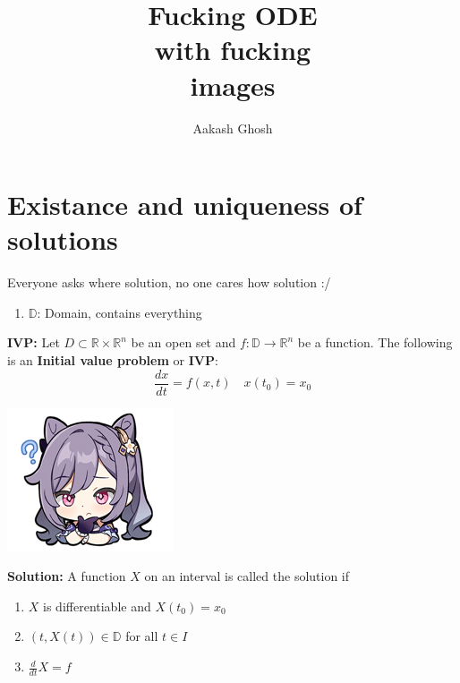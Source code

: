 \documentclass{tufte-book}
\title{Fucking ODE\\\noindent with fucking\\\noindent images}
\author[Aakash Ghosh]{Aakash Ghosh}
\begin{document}
\maketitle


\tableofcontents

\mainmatter

















\chapter{Existance and uniqueness of solutions}
Everyone asks where solution, no one cares how solution :/
\begin{enumerate}
	\item $\mathbb D$: Domain, contains everything
\end{enumerate}

\begin{tcolorbox}[colback=red!5!white]
\textbf{IVP: }Let $D\subset \mathbb R\times \mathbb R^n$ be an open set and $f:\mathbb D\to \mathbb R^n$ be a function. The following is an \textbf{Initial value problem} or \textbf{IVP}:
$$\frac{dx}{dt}=f(x,t)\quad x(t_0)=x_0$$ 
\end{tcolorbox}

\begin{marginfigure}
	\includegraphics{1.png}
\end{marginfigure}


\begin{tcolorbox}[colback=red!5!white]
\textbf{Solution: }A function $X$ on an interval is called the solution if 
\begin{enumerate}
	\item $X$ is differentiable and $X(t_0)=x_0$
	\item $(t,X(t))\in\mathbb D$ for all $t\in I$
	\item $\frac{d}{dt}X=f$
\end{enumerate}  
\end{tcolorbox}
\end{document}
